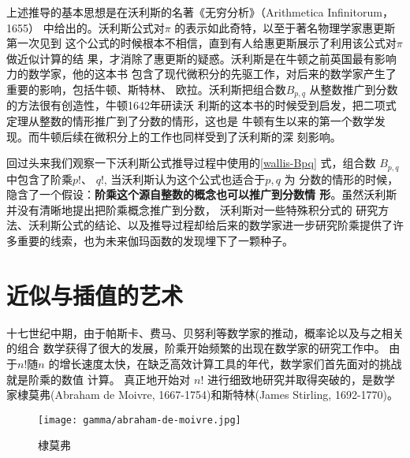 {上述推导的基本思想是在沃利斯的名著《无穷分析》（Arithmetica Infinitorum，1655）
中给出的。沃利斯公式对$\pi$ 的表示如此奇特，以至于著名物理学家惠更斯第一次见到
这个公式的时候根本不相信，直到有人给惠更斯展示了利用该公式对$\pi$做近似计算的结
果，才消除了惠更斯的疑惑。沃利斯是在牛顿之前英国最有影响力的数学家，他的这本书
包含了现代微积分的先驱工作，对后来的数学家产生了重要的影响，包括牛顿、斯特林、
欧拉。沃利斯把组合数$B_{p,q}$ 从整数推广到分数的方法很有创造性，牛顿1642年研读沃
利斯的这本书的时候受到启发，把二项式定理从整数的情形推广到了分数的情形，这也是
牛顿有生以来的第一个数学发现。而牛顿后续在微积分上的工作也同样受到了沃利斯的深
刻影响。 

回过头来我们观察一下沃利斯公式推导过程中使用的\eqref{wallis-Bpq} 式，组合数
$B_{p,q}$ 中包含了阶乘$p!$、 $q!$, 当沃利斯认为这个公式也适合于$p, q$ 为
分数的情形的时候，隐含了一个假设：{\bf 阶乘这个源自整数的概念也可以推广到分数情
形}。虽然沃利斯并没有清晰地提出把阶乘概念推广到分数， 沃利斯对一些特殊积分式的
研究方法、沃利斯公式的结论、以及推导过程却给后来的数学家进一步研究阶乘提供了许
多重要的线索，也为未来伽玛函数的发现埋下了一颗种子。 

\section{近似与插值的艺术}

十七世纪中期，由于帕斯卡、费马、贝努利等数学家的推动，概率论以及与之相关的组合
数学获得了很大的发展，阶乘开始频繁的出现在数学家的研究工作中。 由于$n!$随$n$
的增长速度太快，在缺乏高效计算工具的年代，数学家们首先面对的挑战就是阶乘的数值
计算。 真正地开始对 $n!$ 进行细致地研究并取得突破的，是数学家棣莫弗(Abraham
de Moivre, 1667-1754)和斯特林(James Stirling, 1692-1770)。

\begin{figure}[htbp]
\centering
\vspace{1cm}
\texttt{[image: gamma/abraham-de-moivre.jpg]}
\caption{棣莫弗}
\end{figure}

}
